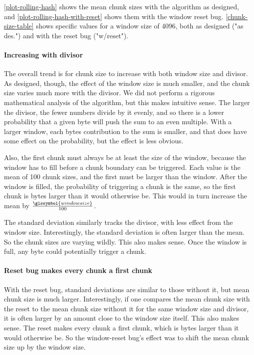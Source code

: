 \autoref{plot-rolling-hash} shows the mean chunk sizes with the algorithm as
designed, and \autoref{plot-rolling-hash-with-reset} shows them with the window
reset bug. \autoref{chunk-size-table} shows specific values for a window size of
4096, both as designed ("as des.") and with the reset bug ("w/reset").

\paragraph{Increasing with divisor}

The overall trend is for chunk size to increase with both window size and
divisor. As designed, though, the effect of the window size is much smaller, and
the chunk size varies much more with the divisor. We did not perform a rigorous
mathematical analysis of the algorithm, but this makes intuitive sense. The
larger the divisor, the fewer numbers divide by it evenly, and so there is a
lower probability that a given byte will push the sum to an even multiple. With
a larger window, each bytes contribution to the sum is smaller, and that does
have some effect on the probability, but the effect is less obvious.

Also, the first chunk must always be at least the size of the window, because
the window has to fill before a chunk boundary can be triggered. Each value is
the mean of 100 chunk sizes, and the first must be larger than the window. After
the window is filled, the probability of triggering a chunk is the same, so the
first chunk is  bytes larger than it would otherwise be.
This would in turn increase the mean by $\frac{\glssymbol{windowsize}}{100}$.

The standard deviation similarly tracks the divisor, with less effect from the
window size. Interestingly, the standard deviation is often larger than the
mean. So the chunk sizes are varying wildly. This also makes sense. Once the
window is full, any byte could potentially trigger a chunk.

\paragraph{Reset bug makes every chunk a first chunk}

With the reset bug, standard deviations are similar to those without it, but
mean chunk size is much larger. Interestingly, if one compares the mean chunk
size with the reset to the mean chunk size without it for the same window size
and divisor, it is often larger by an amount close to the window size itself.
This also makes sense. The reset makes every chunk a first chunk, which is
 bytes larger than it would otherwise be. So the
window-reset bug's effect was to shift the mean chunk size up by the window
size.

